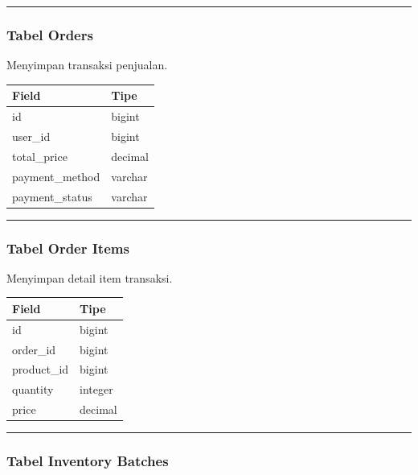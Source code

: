 \begin{center}\rule{0.5\linewidth}{0.5pt}\end{center}

\subsubsection{Tabel Orders}\label{tabel-orders}

Menyimpan transaksi penjualan.

{\def\LTcaptype{none} %
\begin{longtable}[]{@{}ll@{}}
\toprule\noalign{}
Field & Tipe \\
\midrule\noalign{}
\endhead
\bottomrule\noalign{}
\endlastfoot
id & bigint \\
user\_id & bigint \\
total\_price & decimal \\
payment\_method & varchar \\
payment\_status & varchar \\
\end{longtable}
}

\begin{center}\rule{0.5\linewidth}{0.5pt}\end{center}

\subsubsection{Tabel Order Items}\label{tabel-order-items}

Menyimpan detail item transaksi.

{\def\LTcaptype{none} %
\begin{longtable}[]{@{}ll@{}}
\toprule\noalign{}
Field & Tipe \\
\midrule\noalign{}
\endhead
\bottomrule\noalign{}
\endlastfoot
id & bigint \\
order\_id & bigint \\
product\_id & bigint \\
quantity & integer \\
price & decimal \\
\end{longtable}
}

\begin{center}\rule{0.5\linewidth}{0.5pt}\end{center}

\subsubsection{Tabel Inventory Batches}\label{tabel-inventory-batches}

